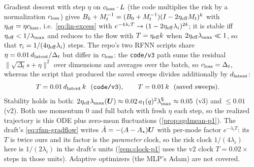 \begin{remark}\label{rem:lin-gd}
Gradient descent with step $\eta$ on $c_{\rm loss}\cdot L$ (the code multiplies the risk by a normalization $c_{\rm loss}$) gives $B_k+M_t^{-1}=(B_0+M_t^{-1})(I-2\eta_{\rm eff}M_t)^k$ with $\eta_{\rm eff}=\eta c_{\rm loss}$, i.e.\ \eqref{eq:lin-excess} with $e^{-4\lambda_iT}\to(1-2\eta_{\rm eff}\lambda_i)^{2k}$; it is stable iff $\eta_{\rm eff}<1/\lambda_{\max}$ and reduces to the flow with $T=\eta_{\rm eff}k$ when $2\eta_{\rm eff}\lambda_{\max}\ll1$, so that $\tau_i=1/(4\eta_{\rm eff}\lambda_i)$ steps. The repo's two RFNN scripts share $\eta=0.01\,d_{\mathrm{latent}}/\Delta_t$ but differ in $c_{\rm loss}$: the \texttt{code/v3} path sums the residual $\|\sqrt{\Delta_t}s+\eta\|^2$ over dimensions and averages over the batch, so $c_{\rm loss}=\Delta_t$, whereas the script that produced the saved sweeps divides additionally by $d_{\mathrm{latent}}$:
\begin{equation}\label{eq:lin-steps}
T=0.01\,d_{\mathrm{latent}}\,k\ \ (\texttt{code/v3}),\qquad T=0.01\,k\ \ (\text{saved sweeps}).
\end{equation}
Stability holds in both: $2\eta_{\rm eff}\lambda_{\max}(\bm{U})\approx0.02\,a_1(q)^2\lambda^{\mathsf S}_{\max}\approx0.05$ (v3) and $\le0.01$ (v2). Both use momentum $0$ and full batch with fresh $\eta$ each step, so the realized trajectory is this ODE plus zero-mean fluctuations (\cref{prop:sgdmean-p1}). The draft's \eqref{eq:rfnn-gradflow} writes $\dot A=-(A-A_\star)\bm{U}$ with per-mode factor $e^{-\lambda_iT}$: its $T$ is twice ours and its factor is the \emph{parameter} clock, so the risk clock $1/(4\lambda_i)$ here is $1/(2\lambda_i)$ in the draft's units (\cref{rem:clock-p1} uses the v2 clock $T=0.02\times$steps in those units). Adaptive optimizers (the MLP's Adam) are not covered.
\end{remark}

